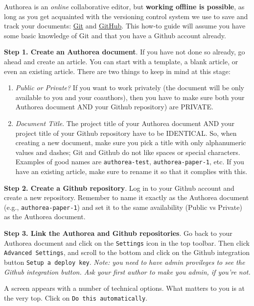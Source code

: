 Authorea is an \textit{online} collaborative editor, but \textbf{working offline is possible}, as long as you get acquainted with the versioning control system we use to save and track your documents: \href{http://git-scm.com/}{Git} and \href{http://github.com/}{GitHub}. This how-to guide will assume you have some basic knowledge of Git and that you have a Github account already. 

\textbf{Step 1. Create an Authorea document}. If you have not done so already, go ahead and create an article. You can start with a template, a blank article, or even an existing article. There are two things to keep in mind at this stage:

\begin{enumerate}
\item \textit{Public or Private?} If you want to work privately (the document will be only available to you and your coauthors), then you have to make sure both your Authorea document AND your Github repository) are PRIVATE.
\item \textit{Document Title}. The project title of your Authorea document AND your project title of your Github repository have to be IDENTICAL. So, when creating a new document, make sure you pick a title with only alphanumeric values and dashes; Git and Github do not like spaces or special characters. Examples of good names are \verb|authorea-test|, \verb|authorea-paper-1|, etc. If you have an existing article, make sure to rename it so that it complies with this.
\end{enumerate}

\textbf{Step 2. Create a Github repository}. Log in to your Github account and create a new repository. Remember to name it exactly as the Authorea document (e.g., \verb|authorea-paper-1|) and set it to the same availability (Public vs Private) as the Authorea document.

\textbf{Step 3. Link the Authorea and Github repositories}. Go back to your Authorea document and click on the \verb|Settings| icon in the top toolbar. Then click \verb|Advanced Settings|, and scroll to the bottom and click on the Github integration button \verb|Setup a deploy key|. \textit{Note: you need to have admin provileges to see the Github integration button. Ask your first author to make you admin, if you're not.} 

A screen appears with a number of technical options. What matters to you is at the very top. Click on \verb|Do this automatically|. 



